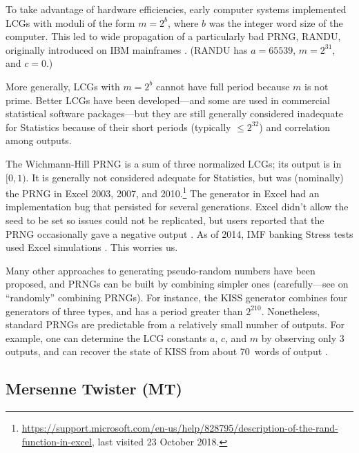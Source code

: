 \documentclass[graybox]{svmult}
\begin{document}
To take advantage of hardware efficiencies, early computer systems implemented LCGs 
with moduli of the form 
$m = 2^b$, where
$b$ was the integer word size of the computer.
This led to wide propagation of a particularly bad PRNG, RANDU, originally introduced
on IBM mainframes \cite{knuth_art_1997,markowsky14}.
(RANDU has $a=65539$, $m=2^{31}$, and $c=0$.)

More generally, LCGs with $m=2^b$ cannot have full period because $m$ is not prime. 
Better LCGs have been developed---and some are used in commercial statistical software packages---but they are still
generally considered inadequate for Statistics because of their short periods (typically $ \le 2^{32}$) 
and correlation among outputs.

The Wichmann-Hill PRNG is a sum of three normalized LCGs; its output is in $[0, 1)$.
%
It is generally not considered adequate for Statistics, but was (nominally) the PRNG in Excel 
2003, 2007, and 2010.\footnote{%
\url{https://support.microsoft.com/en-us/help/828795/description-of-the-rand-function-in-excel}, last visited 23 October 2018.}
The generator in Excel had an implementation bug that persisted for several generations.
Excel didn't allow the seed to be set so issues could not be replicated, but users reported that the PRNG occasionally gave a negative output \cite{mccullough_microsoft_2008}.
As of 2014, IMF banking Stress tests used Excel simulations \cite{ong14}.
This worries us.

Many other approaches to generating pseudo-random numbers have been
proposed, and PRNGs can be built by combining simpler ones (carefully---see \cite{knuth_art_1997} on ``randomly'' combining PRNGs).
For instance, the KISS generator combines four generators of three types, and has a period greater than $2^{210}$.
Nonetheless, standard PRNGs are predictable from a relatively small number of outputs.
For example, one can determine the LCG constants $a$, $c$, and $m$ by observing only 3 outputs,
and can recover the state of KISS from about 70~words of output \cite{rose11}.


\subsection{Mersenne Twister (MT)}
\end{document}
